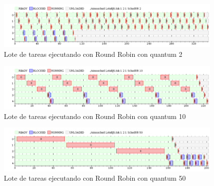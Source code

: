 
\begin{figure}[H]
\caption{Lote de tareas ejecutando con Round Robin con quantum 2}
\label{fig:ej5q2}
\includegraphics[width=1\textwidth]{imgs/ej5-q2.png}
\end{figure}

\begin{figure}[H]
\caption{Lote de tareas ejecutando con Round Robin con quantum 10}
\label{fig:ej5q10}
\includegraphics[width=1\textwidth]{imgs/ej5-q10.png}
\end{figure}

\begin{figure}[H]
\caption{Lote de tareas ejecutando con Round Robin con quantum 50}
\label{fig:ej5q50}
\includegraphics[width=1\textwidth]{imgs/ej5-q50.png}
\end{figure}

